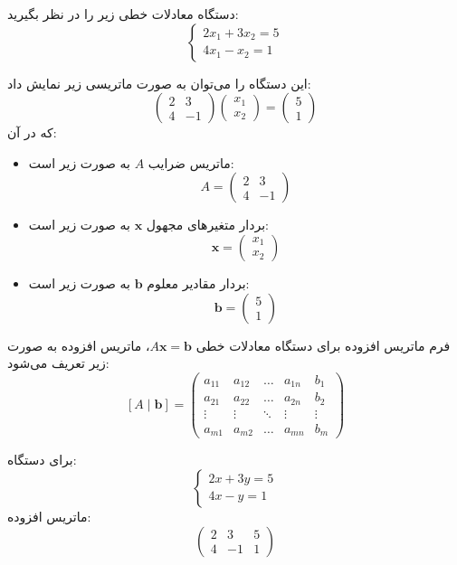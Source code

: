 \begin{example}
دستگاه معادلات خطی زیر را در نظر بگیرید:
\[
\begin{cases}
	2x_1 + 3x_2 = 5 \\
	4x_1 - x_2 = 1
\end{cases}
\]

این دستگاه را می‌توان به صورت ماتریسی زیر نمایش داد:
\[
\begin{pmatrix}
	2 & 3 \\
	4 & -1
\end{pmatrix}
\begin{pmatrix}
	x_1 \\
	x_2
\end{pmatrix}
=
\begin{pmatrix}
	5 \\
	1
\end{pmatrix}
\]
که در آن:

\begin{itemize}
	\item 
	ماتریس ضرایب \( A \) به صورت زیر است:
	\[
	A = \begin{pmatrix}
		2 & 3 \\
		4 & -1
	\end{pmatrix}
	\]
	
	\item 
	بردار متغیرهای مجهول \( \mathbf{x} \) به صورت زیر است:
	\[
	\mathbf{x} = \begin{pmatrix}
		x_1 \\
		x_2
	\end{pmatrix}
	\]
	
	\item 
	بردار مقادیر معلوم \( \mathbf{b} \) به صورت زیر است:
	\[
	\mathbf{b} = \begin{pmatrix}
		5 \\
		1
	\end{pmatrix}
	\]	
\end{itemize}
\end{example}
\begin{definition}
فرم ماتریس افزوده 
برای دستگاه معادلات خطی \( A\mathbf{x} = \mathbf{b} \)، ماتریس افزوده به صورت زیر تعریف می‌شود:
\[
[A \mid \mathbf{b}] = 
\left(
\begin{array}{cccc|c}
	a_{11} & a_{12} & \dots & a_{1n} & b_1 \\
	a_{21} & a_{22} & \dots & a_{2n} & b_2 \\
	\vdots & \vdots & \ddots & \vdots & \vdots \\
	a_{m1} & a_{m2} & \dots & a_{mn} & b_m
\end{array}
\right)
\]
	
\end{definition}
\begin{example}[]
	برای دستگاه:
	\[
	\begin{cases}
		2x + 3y = 5 \\
		4x - y = 1
	\end{cases}
	\]
	ماتریس افزوده:
	\[
	\left(
	\begin{array}{cc|c}
		2 & 3 & 5 \\
		4 & -1 & 1
	\end{array}
	\right)
	\]
\end{example}
 
